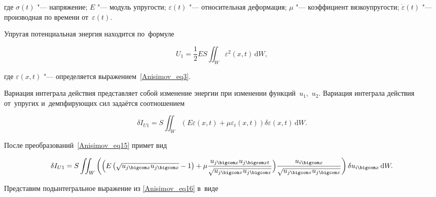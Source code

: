 где $\sigma(t)$ "---  напряжение; $E$ "---  модуль упругости; $\varepsilon(t)$ "---  относительная деформация; $\mu$ "---  коэффициент вязкоупругости; $\dot{\varepsilon}(t)$ "---  производная по времени от~$\varepsilon(t)$.



Упругая потенциальная энергия находится по~формуле

\begin{equation}\label{Anisimov_eq14}

U_1=\frac12ES\iint_{W}\varepsilon^2( x,  t )\,\mathrm{d}W,

\end{equation}

где $\varepsilon( x,  t )$ "---  определяется выражением~\eqref{Anisimov_eq3}.



Вариация интеграла действия представляет собой изменение энергии при изменении функций~$u_1$,~$u_2$. Вариация интеграла действия от~упругих и~демпфирующих сил задаётся соотношением

\begin{equation}\label{Anisimov_eq15}

\delta I_{U1}=S\iint_{W}\left(E\varepsilon( x,  t )+ \mu\varepsilon_t( x,  t )\right)\delta\varepsilon( x,  t )\,\mathrm{d}W.

\end{equation}



После преобразований~\eqref{Anisimov_eq15} примет вид

\begin{equation}\label{Anisimov_eq16}

\delta I_{U1}=S\iint_{W}\left(

\Bigl(E\left(\sqrt{u_{j \bigcom x}u_{j \bigcom x}}-1\right)+ \mu\frac{u_{j \bigcom x}u_{j \bigcom xt}}{\sqrt{u_{j \bigcom x}u_{j \bigcom x}}}\Bigr) \frac{u_{i \bigcom x}}{\sqrt{u_{j \bigcom x}u_{j \bigcom x}}}\right)\delta u_{i \bigcom x}\,\mathrm{d}W.

\end{equation}



Представим подынтегральное выражение из \eqref{Anisimov_eq16} в~виде

